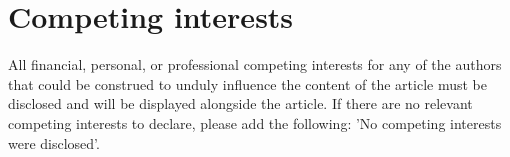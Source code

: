 \section*{Competing interests}
All financial, personal, or professional competing interests for any of the authors that
could be construed to unduly influence the content of the article must be disclosed and will be displayed alongside the article. If there are no relevant competing interests to declare, please add the following: 'No competing interests were disclosed'.
